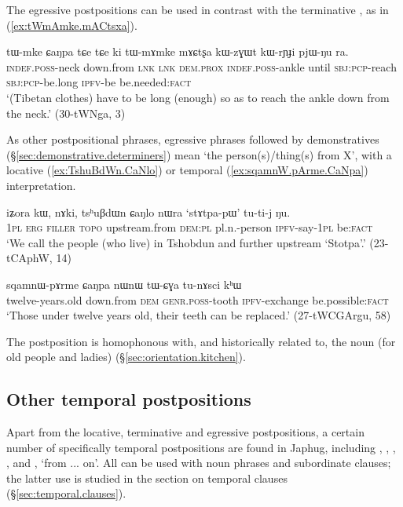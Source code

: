 The egressive postpositions can be used in contrast with the terminative , as in (\ref{ex:tWmAmke.mACtsxa}).

\begin{exe}
\ex \label{ex:tWmAmke.mACtsxa}
 \gll tɯ-mke ɕaŋpa tɕe tɕe ki tɯ-mɤmke mɤɕtʂa kɯ-zɣɯt kɯ-rɲɟi pjɯ-ŋu ra.  \\
\textsc{indef}.\textsc{poss}-neck down.from \textsc{lnk} \textsc{lnk} \textsc{dem}.\textsc{prox} \textsc{indef}.\textsc{poss}-ankle until \textsc{sbj}:\textsc{pcp}-reach  \textsc{sbj}:\textsc{pcp}-be.long \textsc{ipfv}-be be.needed:\textsc{fact} \\  
\glt  `(Tibetan clothes) have to be long (enough) so as to reach the ankle down from the neck.' (30-tWNga, 3)
\end{exe}

As other postpositional phrases, egressive phrases followed by demonstratives (§\ref{sec:demonstrative.determiners}) mean `the person(s)/thing(s) from X', with a locative (\ref{ex:TshuBdWn.CaNlo}) or temporal (\ref{ex:sqamnW.pArme.CaNpa}) interpretation.

 \begin{exe}
\ex \label{ex:TshuBdWn.CaNlo}
 \gll iʑora kɯ, nɤki, tsʰuβdɯn ɕaŋlo nɯra `stɤtpa-pɯ' tu-ti-j ŋu. \\
 \textsc{1pl} \textsc{erg} \textsc{filler}  \textsc{topo} upstream.from \textsc{dem}:\textsc{pl} pl.n.-person \textsc{ipfv}-say-\textsc{1pl} be:\textsc{fact} \\
\glt `We call the people (who live) in Tshobdun and further upstream `Stotpa'.' (23-tCAphW, 14)
\end{exe}

 \begin{exe}
\ex \label{ex:sqamnW.pArme.CaNpa}
 \gll sqamnɯ-pɤrme ɕaŋpa nɯnɯ tɯ-ɕɣa tu-nɤsci kʰɯ \\
 twelve-years.old down.from \textsc{dem} \textsc{genr}.\textsc{poss}-tooth \textsc{ipfv}-exchange be.possible:\textsc{fact} \\
 \glt `Those under twelve years old, their teeth can be replaced.' (27-tWCGArgu, 58)
\end{exe}

The postposition  is homophonous with, and historically related to, the noun  (for old people and ladies) (§\ref{sec:orientation.kitchen}).

\subsection{Other temporal postpositions} \label{sec:temporal.postpositions}
Apart from the locative, terminative and egressive postpositions, a certain number of specifically temporal postpositions are found in Japhug, including ,  , , ,  and , `from ... on'. All can be used with noun phrases and subordinate clauses; the latter use is studied in the section on temporal clauses (§\ref{sec:temporal.clauses}).

